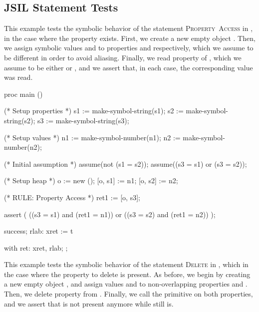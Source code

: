 \subsection{JSIL Statement Tests}

This example tests the symbolic behavior of the \jsil statement \mbox{\textsc{Property Access}} in \cosette, in the case where the property exists.
First, we create a new empty object .
Then, we assign symbolic values  and  to properties  and  respectively, which we assume to be different in order to avoid aliasing.
Finally, we read property  of , which we assume to be either  or , and we assert that, in each case, the corresponding value was read.

\begin{lstjs}
proc main () {
    (* Setup properties *)
    s1 := make-symbol-string(s1);
    s2 := make-symbol-string(s2);
    s3 := make-symbol-string(s3);

    (* Setup values *)
    n1 := make-symbol-number(n1);
    n2 := make-symbol-number(n2);

    (* Initial assumption *)
    assume(not (s1 = s2));
    assume((s3 = s1) or (s3 = s2));

    (* Setup heap *)
    o := new ();
    [o, s1] := n1;
    [o, s2] := n2;


    (* RULE: Property Access *)
    ret1 := [o, s3];

    assert (
        ((s3 = s1) and (ret1 = n1)) or 
        ((s3 = s2) and (ret1 = n2))
    );

    success;
    rlab:    xret := $$t
}
with
{
    ret:    xret, rlab;
};
\end{lstjs}


This example tests the symbolic behavior of the \jsil statement \textsc{Delete} in \cosette, which in the case where the property to delete is present.
As before, we begin by creating a new empty object , and assign values  and  to non-overlapping properties  and .
Then, we delete property  from .
Finally, we call the  primitive on both properties, and we assert that  is not present anymore while  still is.

